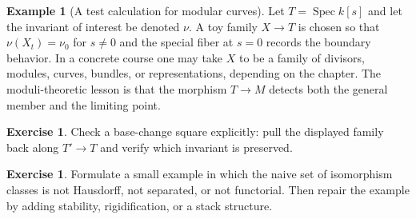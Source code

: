 \documentclass[11pt]{amsart}
\theoremstyle{definition}
\newtheorem{example}[theorem]{Example}
\newtheorem{exercise}[theorem]{Exercise}
\newcommand{\Spec}{\operatorname{Spec}}
\begin{document}
\begin{example}[A test calculation for modular curves]
Let $T=\Spec k[s]$ and let the invariant of interest be denoted $\nu$.  A toy family $X\to T$ is chosen so that $\nu(X_t)=\nu_0$ for $s\ne0$ and the special fiber at $s=0$ records the boundary behavior.  In a concrete course one may take $X$ to be a family of divisors, modules, curves, bundles, or representations, depending on the chapter.  The moduli-theoretic lesson is that the morphism $T\to M$ detects both the general member and the limiting point.
\end{example}
\begin{exercise}
Check a base-change square explicitly: pull the displayed family back along $T\prime\to T$ and verify which invariant is preserved.
\end{exercise}
\begin{exercise}
Formulate a small example in which the naive set of isomorphism classes is not Hausdorff, not separated, or not functorial.  Then repair the example by adding stability, rigidification, or a stack structure.
\end{exercise}
\clearpage
\end{document}
